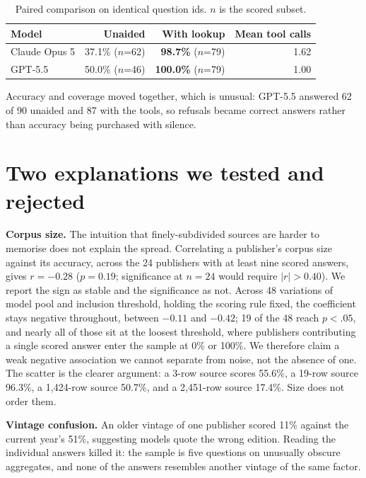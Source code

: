 \documentclass[10pt,a4paper]{article}
\begin{document}
\begin{table}[h]
\centering
\small
\setlength{\tabcolsep}{6pt}
\begin{tabular}{lrrr}
\toprule
Model & Unaided & With lookup & Mean tool calls \\
\midrule
Claude Opus 5 & 37.1\% ($n$=62) & \textbf{98.7\%} ($n$=79) & 1.62 \\
GPT-5.5       & 50.0\% ($n$=46) & \textbf{100.0\%} ($n$=79) & 1.00 \\
\bottomrule
\end{tabular}
\vspace{-0.3em}
\caption{\small Paired comparison on identical question ids. $n$ is the scored subset.}
\end{table}
\vspace{-1.2em}

Accuracy and coverage moved together, which is unusual: GPT-5.5 answered 62 of 90 unaided and 87 with the tools, so refusals became correct answers rather than accuracy being purchased with silence.

\vspace{-0.3em}
\section{Two explanations we tested and rejected}

\textbf{Corpus size.} The intuition that finely-subdivided sources are harder to memorise does not explain the spread. Correlating a publisher's corpus size against its accuracy, across the 24 publishers with at least nine scored answers, gives $r = -0.28$ ($p = 0.19$; significance at $n = 24$ would require $|r| > 0.40$). We report the sign as stable and the significance as not. Across 48 variations of model pool and inclusion threshold, holding the scoring rule fixed, the coefficient stays negative throughout, between $-0.11$ and $-0.42$; 19 of the 48 reach $p < .05$, and nearly all of those sit at the loosest threshold, where publishers contributing a single scored answer enter the sample at 0\% or 100\%. We therefore claim a weak negative association we cannot separate from noise, not the absence of one. The scatter is the clearer argument: a 3-row source scores 55.6\%, a 19-row source 96.3\%, a 1{,}424-row source 50.7\%, and a 2{,}451-row source 17.4\%. Size does not order them.

\textbf{Vintage confusion.} An older vintage of one publisher scored 11\% against the current year's 51\%, suggesting models quote the wrong edition. Reading the individual answers killed it: the sample is five questions on unusually obscure aggregates, and none of the answers resembles another vintage of the same factor.
\end{document}
